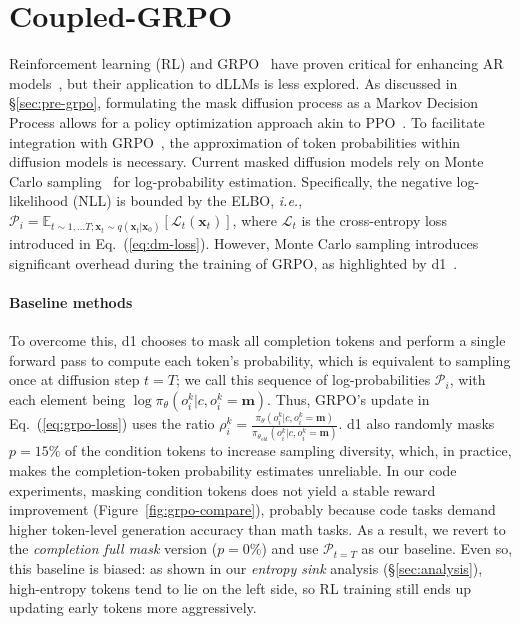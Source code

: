 \section{Coupled-GRPO}
\label{sec:grpo}
Reinforcement learning (RL) and GRPO~\citep{shao2024deepseekmath} have proven critical for enhancing AR models~\citep{bercovich2025llama,shao2025spurious}, but their application to dLLMs is less explored. 
As discussed in \S\ref{sec:pre-grpo}, formulating the mask diffusion process as a Markov Decision Process allows for a policy optimization approach akin to PPO~\citep{schulman2017proximal}. 
To facilitate integration with GRPO~\citep{shao2024deepseekmath}, the approximation of token probabilities within diffusion models is necessary. 
Current masked diffusion models rely on Monte Carlo sampling~\citep{li2025llada, shi2024simplified} for log-probability estimation. 
Specifically, the negative log-likelihood (NLL) is bounded by the ELBO, \textit{i.e.}, $\mathcal{P}_i = \mathbb E_{t\sim1,...T;\bm{x}_t\sim q(\bm{x}_t|\bm{x}_0)} [\mathcal{L}_{t}(\bm{x}_t)]$, where $\mathcal{L}_{t}$ is the cross-entropy loss introduced in Eq.~(\ref{eq:dm-loss}). 
However, Monte Carlo sampling introduces significant overhead during the training of GRPO, as highlighted by d1~\citep{zhao2025d1}. 
\paragraph{Baseline methods}
To overcome this, d1 chooses to mask all completion tokens and perform a single forward pass to compute each token's probability, which is equivalent to sampling once at diffusion step $t=T$; we call this sequence of log-probabilities $\mathcal P_i$, with each element being $\log\pi_\theta(o_i^k|c,o_i^k=\bm{m})$. 
Thus, GRPO's update in Eq.~(\ref{eq:grpo-loss}) uses the ratio $\rho_i^k =\frac{\pi_\theta(o_i^k| c,o_i^k=\bm{m})}{\pi_{\theta_\text{old}}(o_i^k| c,o_i^k=\bm{m})}$.
d1 also randomly masks $p=15\%$ of the condition tokens to increase sampling diversity, which, in practice, makes the completion-token probability estimates unreliable. 
In our code experiments, masking condition tokens does not yield a stable reward improvement (Figure~\ref{fig:grpo-compare}), probably because code tasks demand higher token-level generation accuracy than math tasks. 
As a result, we revert to the \emph{completion full mask} version ($p=0\%$) and use $\mathcal P_{t=T}$ as our baseline. 
Even so, this baseline is biased: as shown in our \emph{entropy sink} analysis (\S\ref{sec:analysis}), high-entropy tokens tend to lie on the left side, so RL training still ends up updating early tokens more aggressively.
